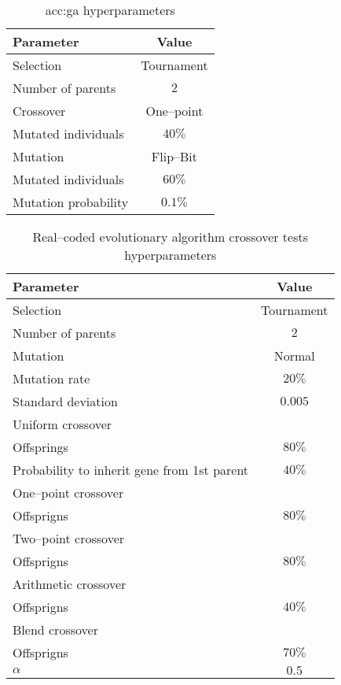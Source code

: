 \begin{table}[h]
    \centering
    \begin{tabular}{|l|c|}
        \hline
        \textbf{Parameter} & \textbf{Value} \\
        \hline
        Selection & Tournament \\
        \quad Number of parents & $2$ \\
        Crossover & One--point \\
        \quad Mutated individuals & $40\%$ \\
        Mutation & Flip--Bit \\
        \quad Mutated individuals & $60\%$ \\
        \quad Mutation probability & $0.1\%$ \\
        \hline
    \end{tabular}
    \caption{\acrlong*{acc:ga} hyperparameters}
    \label{tab:gahyperparameters}
\end{table}

\begin{table}[h]
    \centering
    \begin{tabular}{|l|c|}
        \hline
        \textbf{Parameter} & \textbf{Value} \\
        \hline
        Selection & Tournament \\
        \quad Number of parents & $2$ \\
        Mutation & Normal \\
        \quad Mutation rate & $20\%$ \\
        \quad Standard deviation & $0.005$ \\
        \hline
        Uniform crossover & \\
        \quad Offsprings & $80\%$ \\
        \quad Probability to inherit gene from 1st parent & $40\%$ \\
        One--point crossover & \\
        \quad Offsprigns & $80\%$ \\
        Two--point crossover & \\
        \quad Offsprigns & $80\%$ \\
        Arithmetic crossover & \\
        \quad Offsprigns & $40\%$ \\
        Blend crossover & \\
        \quad Offsprigns & $70\%$ \\
        \quad $\alpha$ & $0.5$ \\
        \hline
    \end{tabular}
    \caption{Real--coded evolutionary algorithm crossover tests hyperparameters}
    \label{tab:escrossoverhyperparmarameters}
\end{table}

